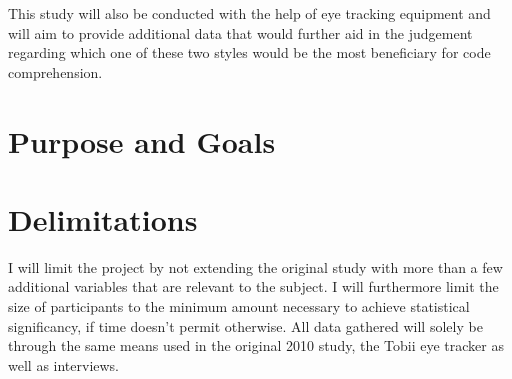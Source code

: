 This study will also be conducted with the help of eye tracking equipment and will aim to provide additional data that would further aid in the judgement regarding which one of these two styles would be the most beneficiary for code comprehension. 


\section{Purpose and Goals}
\iffalse
\begin{itemize}
	\item Write about the grand scheme of things
	\item Set the correct expectations
	\item What can I expect to learn if I keep on reading?
	\item What are the success criteria for this work?
	\item How will the work be evaluated?
\end{itemize}
\fi

\section{Delimitations}
\iffalse
\begin{itemize}
	\item Scale down expectations and clarify
\end{itemize}
\fi

I will limit the project by not extending the original study with more than a few additional variables that are relevant to the subject. I will furthermore limit the size of participants to the minimum amount necessary to achieve statistical significancy, if time doesn't permit otherwise. All data gathered will solely be through the same means used in the original 2010 study, the Tobii eye tracker as well as interviews.